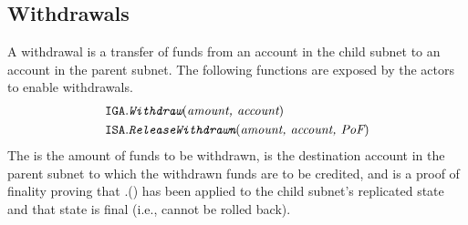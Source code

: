 

 



\subsection{Withdrawals}
\label{sec:withdraw}

A withdrawal is a transfer of funds from an account in the child subnet to an account in the parent subnet.
The following functions are exposed by the \ipc actors to enable withdrawals.
\begin{align*}
    \texttt{IGA}.&\textit{\texttt{Withdraw}}(\textit{amount, account})\\
    \texttt{ISA}.&\textit{\texttt{ReleaseWithdrawn}}(\textit{amount, account, \textit{PoF}})
\end{align*}
The  is the amount of funds to be withdrawn,  is the destination account in the parent subnet to which the withdrawn funds are to be credited, and \funcParam{\pof} is a proof of finality proving that \gw.() has been applied to the child subnet's replicated state and that state is final (i.e., cannot be rolled back).

